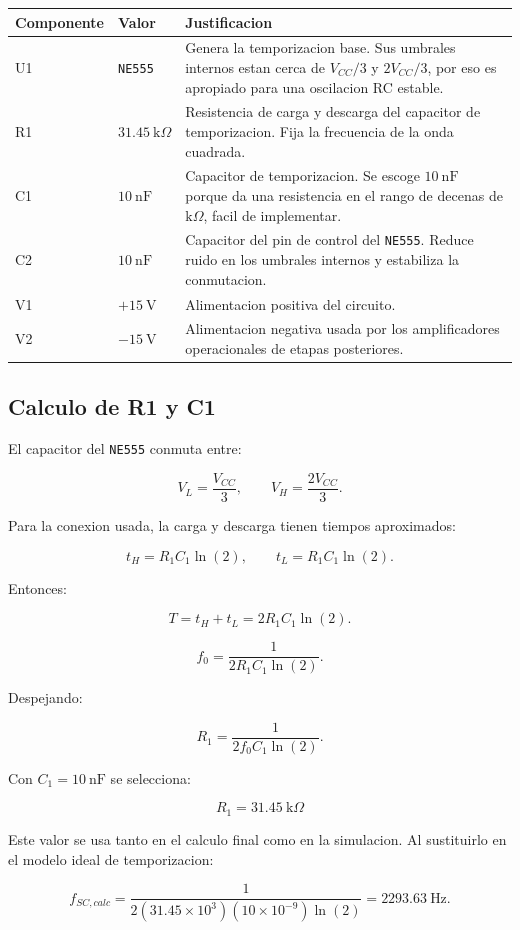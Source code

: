 ﻿\documentclass[11pt,letterpaper]{article}
\newcommand{\kohm}{\text{k}\Omega}
\begin{document}
\begin{longtable}{p{2.0cm}p{4.2cm}p{8.7cm}}
\toprule
Componente & Valor & Justificacion \\
\midrule
\endhead
U1 & \texttt{NE555} & Genera la temporizacion base. Sus umbrales internos
estan cerca de \(V_{CC}/3\) y \(2V_{CC}/3\), por eso es apropiado para una
oscilacion RC estable. \\
R1 & \(31.45~\kohm\) & Resistencia de carga y descarga del capacitor de
temporizacion. Fija la frecuencia de la onda cuadrada. \\
C1 & \(10~\text{nF}\) & Capacitor de temporizacion. Se escoge \(10~\text{nF}\)
porque da una resistencia en el rango de decenas de \(\kohm\), facil de
implementar. \\
C2 & \(10~\text{nF}\) & Capacitor del pin de control del \texttt{NE555}. Reduce
ruido en los umbrales internos y estabiliza la conmutacion. \\
V1 & \(+15~\text{V}\) & Alimentacion positiva del circuito. \\
V2 & \(-15~\text{V}\) & Alimentacion negativa usada por los amplificadores
operacionales de etapas posteriores. \\
\bottomrule
\end{longtable}

\subsection{Calculo de R1 y C1}

El capacitor del \texttt{NE555} conmuta entre:

\[
V_L=\frac{V_{CC}}{3},
\qquad
V_H=\frac{2V_{CC}}{3}.
\]

Para la conexion usada, la carga y descarga tienen tiempos aproximados:

\[
t_H=R_1C_1\ln(2),
\qquad
t_L=R_1C_1\ln(2).
\]

Entonces:

\[
T=t_H+t_L=2R_1C_1\ln(2).
\]

\[
f_0=\frac{1}{2R_1C_1\ln(2)}.
\]

Despejando:

\[
R_1=\frac{1}{2f_0C_1\ln(2)}.
\]

Con \(C_1=10~\text{nF}\) se selecciona:

\[
\boxed{R_1=31.45~\kohm}
\]

Este valor se usa tanto en el calculo final como en la simulacion. Al
sustituirlo en el modelo ideal de temporizacion:

\[
f_{SC,calc}=
\frac{1}{2(31.45\times10^3)(10\times10^{-9})\ln(2)}
=2293.63~\text{Hz}.
\]
\end{document}
